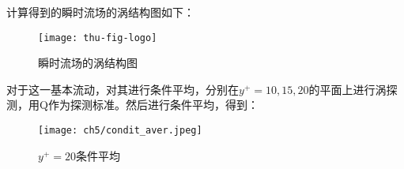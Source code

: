 计算得到的瞬时流场的涡结构图如下：
\begin{figure}
  \centering
  \texttt{[image: thu-fig-logo]}
  \caption{瞬时流场的涡结构图}
\end{figure}
对于这一基本流动，对其进行条件平均，分别在$y^+=10,15,20$的平面上进行涡探测，用Q作为探测标准。然后进行条件平均，得到：
\begin{figure}
  \centering
  \texttt{[image: ch5/condit\_aver.jpeg]}
  \caption{$y^+=20$条件平均}
\end{figure}

